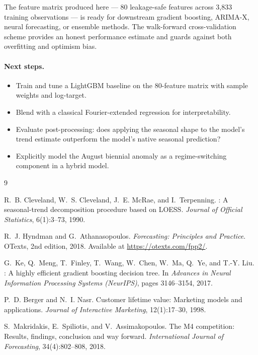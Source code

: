 \documentclass{article}
\begin{document}
The feature matrix produced here — 80 leakage-safe features across 3,833
training observations — is ready for downstream gradient boosting, ARIMA-X,
neural forecasting, or ensemble methods.
The walk-forward cross-validation scheme provides an honest performance estimate
and guards against both overfitting and optimism bias.

\paragraph{Next steps.}
\begin{itemize}[leftmargin=1.5em, itemsep=2pt]
  \item Train and tune a LightGBM baseline on the 80-feature matrix with
    sample weights and log-target.
  \item Blend with a classical Fourier-extended regression for interpretability.
  \item Evaluate post-processing: does applying the seasonal shape to the model's
    trend estimate outperform the model's native seasonal prediction?
  \item Explicitly model the August biennial anomaly as a regime-switching
    component in a hybrid model.
\end{itemize}


\begin{thebibliography}{9}

R.~B. Cleveland, W.~S. Cleveland, J.~E. McRae, and I.~Terpenning.
: A seasonal-trend decomposition procedure based on {LOESS}.
\newblock \emph{Journal of Official Statistics}, 6(1):3--73, 1990.

R.~J. Hyndman and G.~Athanasopoulos.
\newblock \emph{Forecasting: Principles and Practice}.
\newblock OTexts, 2nd edition, 2018.
\newblock Available at \url{https://otexts.com/fpp2/}.

G.~Ke, Q.~Meng, T.~Finley, T.~Wang, W.~Chen, W.~Ma, Q.~Ye, and T.-Y. Liu.
: A highly efficient gradient boosting decision tree.
\newblock In \emph{Advances in Neural Information Processing Systems (NeurIPS)},
  pages 3146--3154, 2017.

P.~D. Berger and N.~I. Nasr.
\newblock Customer lifetime value: Marketing models and applications.
\newblock \emph{Journal of Interactive Marketing}, 12(1):17--30, 1998.

S.~Makridakis, E.~Spiliotis, and V.~Assimakopoulos.
\newblock The {M4} competition: Results, findings, conclusion and way forward.
\newblock \emph{International Journal of Forecasting}, 34(4):802--808, 2018.

\end{thebibliography}
\end{document}
